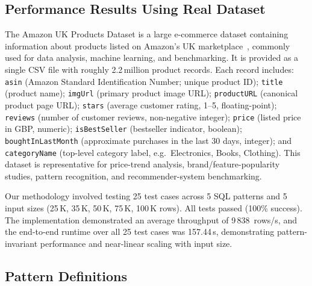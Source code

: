 \subsection{Performance Results Using Real Dataset}
\label{subsec:eval-real-dataset}

The Amazon UK Products Dataset is a large e-commerce dataset
containing information about products listed on Amazon's UK
marketplace~\cite{asaniczka2023amazon}, commonly used for data
analysis, machine learning, and benchmarking.  It is provided as a
single CSV file with roughly 2.2\,million product records.  Each
record includes: \texttt{asin} (Amazon Standard Identification Number;
unique product ID); \texttt{title} (product name); \texttt{imgUrl}
(primary product image URL); \texttt{productURL} (canonical product
page URL); \texttt{stars} (average customer rating, 1--5,
floating-point); \texttt{reviews} (number of customer reviews,
non-negative integer); \texttt{price} (listed price in GBP, numeric);
\texttt{isBestSeller} (bestseller indicator, boolean);
\texttt{boughtInLastMonth} (approximate purchases in the last 30 days,
integer); and \texttt{categoryName} (top-level category label, e.g.\
Electronics, Books, Clothing).  This dataset is representative for
price-trend analysis, brand/feature-popularity studies, pattern
recognition, and recommender-system benchmarking.

Our methodology involved testing 25 test cases across 5 SQL patterns
and 5 input sizes (25\,K, 35\,K, 50\,K, 75\,K, 100\,K rows).  All
tests passed (100\% success).  The implementation demonstrated an
average throughput of 9\,838~rows/s, and the end-to-end runtime over
all 25 test cases was 157.44\,s, demonstrating pattern-invariant
performance and near-linear scaling with input size.

\subsection{Pattern Definitions}
\label{subsec:eval-pattern-defs}

